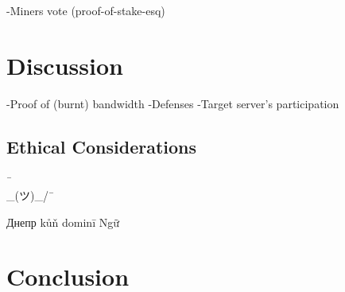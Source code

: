 -Miners vote (proof-of-stake-esq)




\section{Discussion}

-Proof of (burnt) bandwidth
-Defenses
-Target server's participation

\subsection{Ethical Considerations}
¯\\\_(ツ)\_/¯

Днепр kůň dominī Ngữ

\section{Conclusion}



{\footnotesize\balance

}


